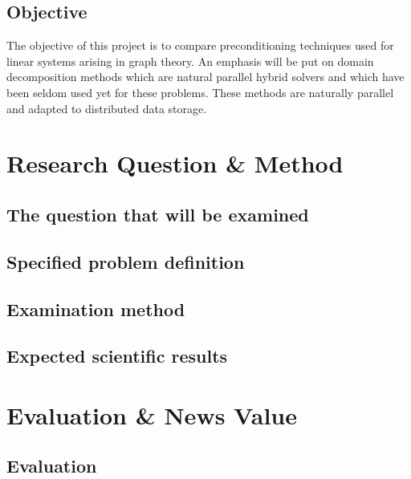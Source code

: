 \documentclass[12pt]{article}
\begin{document}
\subsection*{Objective}

The objective of this project is to compare preconditioning techniques used for linear systems arising in graph theory.
An emphasis will be put on domain decomposition methods which are natural parallel hybrid solvers and which have been seldom used yet for these problems.
These methods are naturally parallel and adapted to distributed data storage.

\section*{Research Question \& Method}

\subsection*{The question that will be examined}


\subsection*{Specified problem definition}


\subsection*{Examination method}


\subsection*{Expected scientific results}


\section*{Evaluation \& News Value}

\subsection*{Evaluation}
\end{document}

